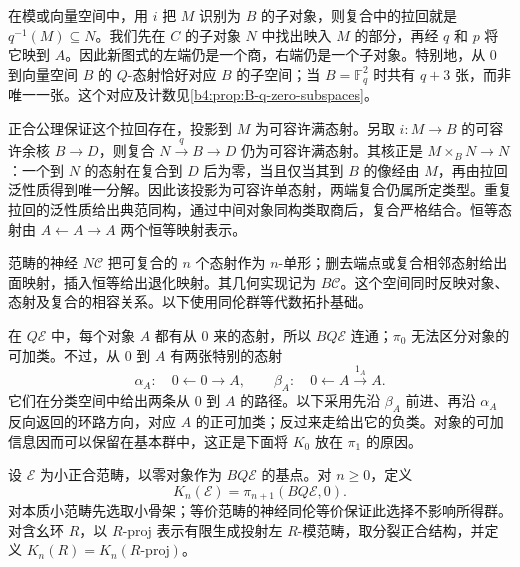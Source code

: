在模或向量空间中，用 \(i\) 把 \(M\) 识别为 \(B\) 的子对象，则复合中的拉回就是 \(q^{-1}(M)\subseteq N\)。我们先在 \(C\) 的子对象 \(N\) 中找出映入 \(M\) 的部分，再经 \(q\) 和 \(p\) 将它映到 \(A\)。因此新图式的左端仍是一个商，右端仍是一个子对象。特别地，从 \(0\) 到向量空间 \(B\) 的 \(Q\)-态射恰好对应 \(B\) 的子空间；当 \(B=\mathbb F_q^2\) 时共有 \(q+3\) 张，而非唯一一张。这个对应及计数见\cref{b4:prop:B-q-zero-subspaces}。

\ProseParagraphBreak
正合公理保证这个拉回存在，投影到 \(M\) 为可容许满态射。另取 \(i:M\rightarrow B\) 的可容许余核 \(B\rightarrow D\)，则复合 \(N\xrightarrow{q}B\rightarrow D\) 仍为可容许满态射。其核正是 \(M\times_BN\rightarrow N\)：一个到 \(N\) 的态射在复合到 \(D\) 后为零，当且仅当其到 \(B\) 的像经由 \(M\)，再由拉回泛性质得到唯一分解。因此该投影为可容许单态射，两端复合仍属所定类型。重复拉回的泛性质给出典范同构，通过中间对象同构类取商后，复合严格结合。恒等态射由 \(A\leftarrow A\rightarrow A\) 两个恒等映射表示。

\ProseParagraphBreak
范畴的神经 \(N\mathcal C\) 把可复合的 \(n\) 个态射作为 \(n\)-单形；删去端点或复合相邻态射给出面映射，插入恒等给出退化映射。其几何实现记为 \(B\mathcal C\)。这个空间同时反映对象、态射及复合的相容关系。以下使用同伦群等代数拓扑基础。

\ProseParagraphBreak
在 \(Q\mathcal E\) 中，每个对象 \(A\) 都有从 \(0\) 来的态射，所以 \(BQ\mathcal E\) 连通；\(\pi_0\) 无法区分对象的可加类。不过，从 \(0\) 到 \(A\) 有两张特别的态射
\[
	\alpha_A:\quad 0\longleftarrow0\longrightarrow A, \qquad \beta_A:\quad 0\longleftarrow A\xrightarrow{1_A}A.
\]
它们在分类空间中给出两条从 \(0\) 到 \(A\) 的路径。以下采用先沿 \(\beta_A\) 前进、再沿 \(\alpha_A\) 反向返回的环路方向，对应 \(A\) 的正可加类；反过来走给出它的负类。对象的可加信息因而可以保留在基本群中，这正是下面将 \(K_0\) 放在 \(\pi_1\) 的原因。

\begin{definition}\label{b4:def:B-higher-k}
	设 \(\mathcal E\) 为小正合范畴，以零对象作为 \(BQ\mathcal E\) 的基点。对 \(n\ge0\)，定义
	\[
		K_n(\mathcal E)=\pi_{n+1}(BQ\mathcal E,0).
	\]
	对本质小范畴先选取小骨架；等价范畴的神经同伦等价保证此选择不影响所得群。对含幺环 \(R\)，以 \(R\text{-}\mathrm{proj}\) 表示有限生成投射左 \(R\)-模范畴，取分裂正合结构，并定义 \(K_n(R)=K_n(R\text{-}\mathrm{proj})\)。
\end{definition}


